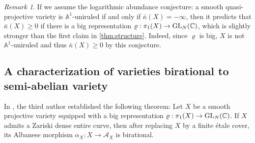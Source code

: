 \documentclass[11pt,english]{smfart}
\theoremstyle{plain}
\theoremstyle{definition}
\theoremstyle{remark}
\newtheorem{rem}[thm]{Remark}
\numberwithin{equation}{subsection}
\theoremstyle{plain}
\newcommand{\cA}{\mathcal A}
\newcommand{\bA}{\mathbb{A}}
\newcommand{\bC}{\mathbb{C}}
\begin{document}
\begin{rem}
If we assume the logarithmic abundance conjecture: a smooth quasi-projective variety is $\bA^1$-uniruled if and only if $\bar{\kappa}(X)=-\infty$, then it predicts that   $\bar{\kappa}(X)\geq 0$ if there is a big representation $\varrho:\pi_1(X)\to {\rm GL}_N(\bC)$, which is slightly stronger than the first claim in \cref{thm:structure}. Indeed, since $\varrho$ is big, $X$ is not $\bA^1$-uniruled and thus $\bar{\kappa}(X)\geq 0$ by this conjecture.  
\end{rem}

\subsection[characterization of  semi-abelian variety]{A characterization of varieties birational to semi-abelian variety} 
In \cite{Yam10}, the third author established the following theorem: Let $X$ be a smooth projective variety equipped with a big representation $\varrho:\pi_1(X)\to {\rm GL}_N(\bC)$. If $X$ admits a Zariski dense entire curve, then after replacing $X$ by a  finite \'etale cover, its Albanese morphism $\alpha_X:X\to \cA_X$ is birational.
\end{document}
